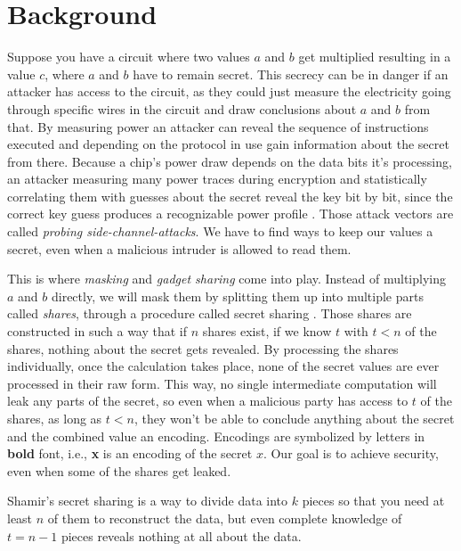 \documentclass[english, version-2020-11]{uzl-thesis}
\begin{document}
\chapter{Background}
Suppose you have a circuit where two values $a$ and $b$ get multiplied resulting in a value $c$, where $a$ and $b$ have to remain secret. This secrecy can be in danger if an attacker has access to the circuit, as they could just measure the electricity going through specific wires in the circuit and draw conclusions about $a$ and $b$ from that. By measuring power an attacker can reveal the sequence of instructions executed and depending on the protocol in use gain information about the secret from there. Because a chip's power draw depends on the data bits it's processing, an attacker measuring many power traces during encryption and statistically correlating them with guesses about the secret reveal the key bit by bit, since the correct key guess produces a recognizable power profile \cite{DiffPowerAnalysis}.
Those attack vectors are called \emph{probing side-channel-attacks}. We have to find ways to keep our values a secret, even when a malicious intruder is allowed to read them.

This is where \textit{masking} and \textit{gadget sharing} come into play. Instead of multiplying $a$ and $b$ directly, we will mask them by splitting them up into multiple parts called \textit{shares}, through a procedure called secret sharing \cite{shamirsecret}. Those shares are constructed in such a way that if $n$ shares exist, if we know $t$ with $t<n$ of the shares, nothing about the secret gets revealed. By processing the shares individually, once the calculation takes place, none of the secret values are ever processed in their raw form. This way, no single intermediate computation will leak any parts of the secret, so even when a malicious party has access to $t$ of the shares, as long as $t<n$, they won't be able to conclude anything about the secret and the combined value an encoding.
Encodings are symbolized by letters in \textbf{bold} font, i.e., \textbf{x} is an encoding of the secret $x$. Our goal is to achieve security, even when some of the shares get leaked.
    
\begin{definition}\cite{shamirsecret}
  Shamir's secret sharing is a way to divide data into $k$ pieces so that you need at least $n$ of them to reconstruct the data, but even complete knowledge of $t=n-1$ pieces reveals nothing at all about the data. 
    \end{definition}
\end{document}
